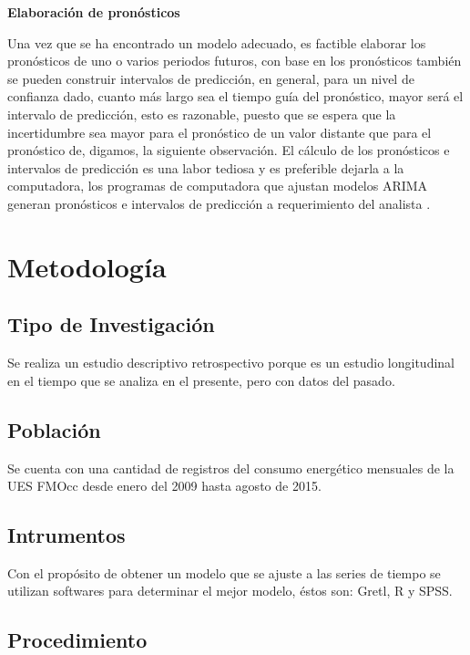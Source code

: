 \documentclass[12pt,letterpaper]{report}
\begin{document}
\textbf{Elaboración de pronósticos}

Una vez que se ha encontrado un modelo adecuado, es factible elaborar los pronósticos de uno o varios periodos futuros, con base en los
pronósticos también se pueden construir intervalos de predicción, en
general, para un nivel de confianza dado, cuanto más largo sea el tiempo guía del pronóstico, mayor será el intervalo de predicción, esto es
razonable, puesto que se espera que la incertidumbre sea mayor para
el pronóstico de un valor distante que para el pronóstico de, digamos,
la siguiente observación. El cálculo de los pronósticos e intervalos de
predicción es una labor tediosa y es preferible dejarla a la computadora,
los programas de computadora que ajustan modelos ARIMA generan
pronósticos e intervalos de predicción a requerimiento del analista \cite{Isaac}.




\chapter{Metodología}
\section{Tipo de Investigación}
Se realiza un estudio descriptivo retrospectivo porque es un estudio longitudinal en el tiempo que se analiza en el presente, pero con datos del pasado.
\section{Población}
Se cuenta con una cantidad de registros del consumo energético mensuales de la UES FMOcc desde enero del 2009 hasta agosto de 2015.
\section{Intrumentos}
Con el propósito de obtener un modelo que se ajuste a las series de tiempo
se utilizan softwares para determinar el mejor modelo, éstos son: Gretl, R y
SPSS.

\section{Procedimiento}
\end{document}
